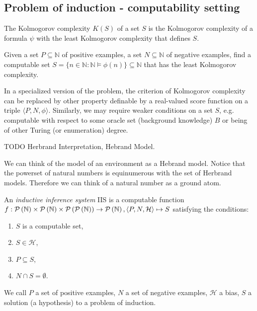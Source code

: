 \subsection{Problem of induction - computability setting}

\begin{defn}
The Kolmogorov complexity $K(S)$ of a set $S$ is the Kolmogorov complexity
of a formula $\psi$ with the least Kolmogorov complexity that defines $S$.
\end{defn}

Given a set $P \subseteq \mathbb{N}$ of positive examples,
a set $N \subseteq \mathbb{N}$ of negative examples,
find a computable set $S = \{n \in \mathbb{N} : \mathbb{N} \models \phi(n) \} \subseteq \mathbb{N}$ that has the least Kolmogorov complexity.

In a specialized version of the problem, the criterion of Kolmogorov complexity can be replaced by other property definable by a real-valued score function on a triple $\langle P, N, \phi \rangle$. Similarly, we may require weaker conditions on a set $S$, e.g. computable with respect to some oracle set (background knowledge) $B$ or being of other Turing (or enumeration) degree.

\begin{defn}
TODO Herbrand Interpretation, Hebrand Model.
\end{defn}

We can think of the model of an environment as a Hebrand model. Notice that the powerset of natural numbers is equinumerous with the set of Herbrand models. Therefore we can think of a natural number as a ground atom.

\begin{defn}
An \emph{inductive inference system} IIS is a computable function
$f: \mathcal{P} \left({ \mathbb{N} }\right) \times \mathcal{P} \left({ \mathbb{N} }\right) \times \mathcal{P} \left({ \mathcal{P} \left({ \mathbb{N} }\right) }\right)
\to \mathcal{P} \left({ \mathbb{N} }\right),
\langle P, N, \mathcal{H} \rangle \mapsto S$
satisfying the conditions:

\begin{enumerate}
\item $S$ is a computable set,
\item $S \in \mathcal{H}$,
\item $P \subseteq S$,
\item $N \cap S = \emptyset$.
\end{enumerate}
\end{defn}

We call $P$ a set of positive examples, $N$ a set of negative examples, $\mathcal{H}$ a bias, $S$ a solution (a hypothesis) to a problem of induction.

